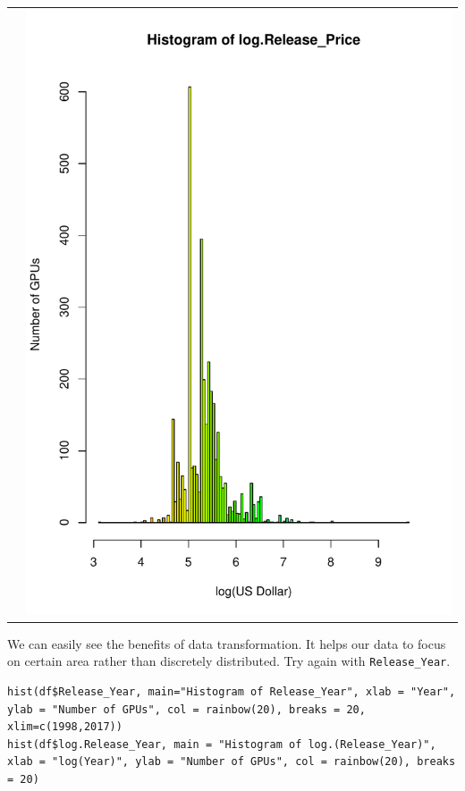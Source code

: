 \documentclass[a4paper]{article}
\begin{document}
\begin{center}
\begin{adjustbox}{width=\textwidth}
\begin{tabular}{cc}
        &\includegraphics[keepaspectratio, width=1\textwidth, height=1\textheight]{Visualization/Hist/log.release_price.pdf}
    \end{tabular}
\end{adjustbox}
\end{center}
We can easily see the benefits of data transformation. It helps our data to focus on certain area rather than discretely distributed. Try again with \verb|Release_Year|.
\begin{mdframed}[leftline=false,rightline=false,backgroundcolor=lightblue!10,nobreak=false]
    \begin{verbatim}
hist(df$Release_Year, main="Histogram of Release_Year", xlab = "Year", ylab = "Number of GPUs", col = rainbow(20), breaks = 20, xlim=c(1998,2017))
hist(df$log.Release_Year, main = "Histogram of log.(Release_Year)", xlab = "log(Year)", ylab = "Number of GPUs", col = rainbow(20), breaks = 20)
    \end{verbatim}
\end{mdframed}
\end{document}
